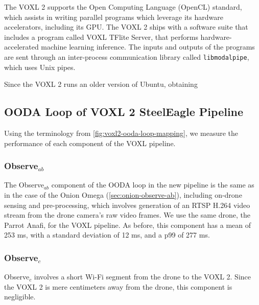 The VOXL 2 supports the Open Computing Language (OpenCL) standard, which
assists in writing parallel programs which leverage its hardware accelerators,
including its GPU. The VOXL 2 ships with a software suite that includes a
program called VOXL TFlite Server, that performs
hardware-accelerated machine learning inference. The inputs and outputs of the
programs are sent through an inter-process communication library called \texttt{libmodalpipe}, which uses Unix pipes.

Since the VOXL 2 runs an older version of Ubuntu, obtaining 


\subsection{OODA Loop of VOXL 2 SteelEagle Pipeline}

Using the terminology from \cref{fig:voxl2-ooda-loop-mapping}, we measure the
performance of each component of the VOXL pipeline.

\subsubsection*{Observe$_{ab}$}

The Observe$_{ab}$ component of the OODA loop in the new pipeline is the same as in
the case of the Onion Omega (\cref{sec:onion-observe-ab}), including on-drone
sensing and pre-processing, which involves generation of an RTSP H.264 video
stream from the drone camera's raw video frames. We use the same drone,
the Parrot Anafi, for the VOXL pipeline. As before, this component has a mean
of 253 ms, with a standard deviation of 12 ms, and a p99 of 277 ms.

\subsubsection*{Observe$_{c}$}

Observe$_c$ involves a short Wi-Fi segment from the drone to the VOXL 2. Since
the VOXL 2 is mere centimeters away from the drone, this component is
negligible.

